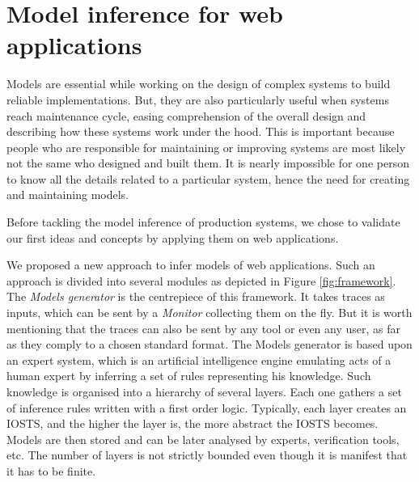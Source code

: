 \chapter{Model inference for web applications}
\label{sec:modelinf:webapps}

Models are essential while working on the design of complex
systems to build reliable implementations. But, they are also
particularly useful when systems reach maintenance cycle, easing
comprehension of the overall design and describing how these
systems work under the hood. This is important because people who
are responsible for maintaining or improving systems are most
likely not the same who designed and built them. It is nearly
impossible for one person to know all the details related to a
particular system, hence the need for creating and maintaining
models.

Before tackling the model inference of production systems, we
chose to validate our first ideas and concepts by applying them
on web applications.


We proposed a new approach to infer models of web applications.
Such an approach is divided into several modules as depicted in
Figure \ref{fig:framework}. The \emph{Models generator} is the
centrepiece of this framework. It takes traces as inputs, which
can be sent by a \emph{Monitor} collecting them on the fly. But
it is worth mentioning that the traces can also be sent by any
tool or even any user, as far as they comply to a chosen standard
format. The Models generator is based upon an expert system,
which is an artificial intelligence engine emulating acts of a
human expert by inferring a set of rules representing his
knowledge. Such knowledge is organised into a hierarchy of
several layers. Each one gathers a set of inference rules written
with a first order logic. Typically, each layer creates an IOSTS,
and the higher the layer is, the more abstract the IOSTS becomes.
Models are then stored and can be later analysed by experts,
verification tools, etc. The number of layers is not strictly
bounded even though it is manifest that it has to be finite.

